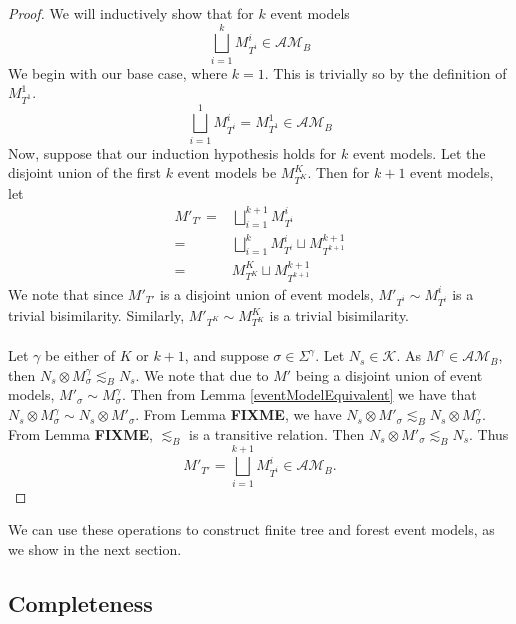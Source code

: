 \documentclass[12pt, a4paper, titlepage]{scrartcl}
\numberwithin{equation}{section}
\newcommand{\kripkeClass}{\mathcal{K}}
\newcommand{\eventClass}{\mathcal{AM}}
\newcommand{\FIXME}{{\bf FIXME}}
\begin{document}
\begin{proof}
We will inductively show that for $k$ event models
\[
	\bigsqcup_{i = 1}^k M^i_{T^i} \in \eventClass_B
\]
We begin with our base case, where $k = 1$.
This is trivially so by the definition of $M^1_{T^1}$.
\[
	\bigsqcup_{i = 1}^1 M^i_{T^i} = M^1_{T^1} \in \eventClass_B
\]
Now, suppose that our induction hypothesis holds for $k$ event models.
Let the disjoint union of the first $k$ event models be $M^K_{T^K}$.
Then for $k+1$ event models, let
\begin{align*}
	M'_{T'} = & \bigsqcup_{i = 1}^{k+1} M^i_{T^i} \\
	= & \bigsqcup_{i = 1}^k M^i_{T^i} \sqcup M^{k+1}_{T^{k+1}} \\
	= & M^K_{T^K} \sqcup M^{k+1}_{T^{k+1}}
\end{align*}
We note that since $M'_{T'}$ is a disjoint union of event models, $M'_{T^i} \sim M^i_{T^i}$ is a
trivial bisimilarity.
Similarly, $M'_{T^K} \sim M^K_{T^K}$ is a trivial bisimilarity.\\
\\
Let $\gamma$ be either of $K$ or $k+1$, and suppose $\sigma \in \Sigma^\gamma$.
Let $N_s \in \kripkeClass$.
As $M^\gamma \in \eventClass_B$, then $N_s \otimes M^\gamma_\sigma \lesssim_B N_s$.
We note that due to $M'$ being a disjoint union of event models, $M'_\sigma \sim M^\gamma_\sigma$.
Then from Lemma \ref{eventModelEquivalent} we have that $N_s \otimes M^\gamma_\sigma \sim N_s
\otimes M'_\sigma$.
From Lemma \FIXME, we have $N_s \otimes M'_\sigma \lesssim_B N_s \otimes M^\gamma_\sigma$.
From Lemma \FIXME, $\lesssim_B$ is a transitive relation.
Then $N_s \otimes M'_\sigma \lesssim_B N_s$.
Thus
\[
M'_{T'} = \bigsqcup_{i = 1}^{k+1} M^i_{T^i} \in \eventClass_B.
\]
\end{proof}

We can use these operations to construct finite tree and forest event models, as we show
in the next section.

\subsection{Completeness}
\end{document}
